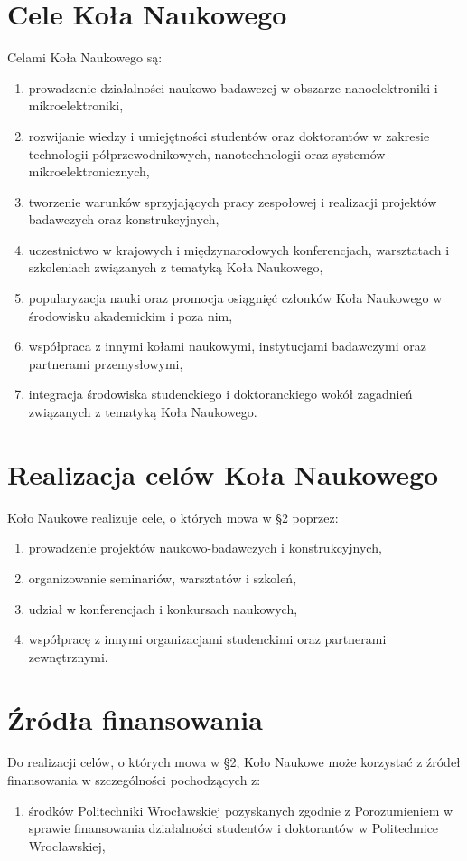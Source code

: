 \documentclass[12pt,a4paper]{article}
\begin{document}
\section{Cele Koła Naukowego}
Celami Koła Naukowego są:
\begin{enumerate}
    \item prowadzenie działalności naukowo-badawczej w obszarze nanoelektroniki i mikroelektroniki,
    \item rozwijanie wiedzy i umiejętności studentów oraz doktorantów w zakresie technologii półprzewodnikowych, nanotechnologii oraz systemów mikroelektronicznych,
    \item tworzenie warunków sprzyjających pracy zespołowej i realizacji projektów badawczych oraz konstrukcyjnych,
    \item uczestnictwo w krajowych i międzynarodowych konferencjach, warsztatach i szkoleniach związanych z tematyką Koła Naukowego,
    \item popularyzacja nauki oraz promocja osiągnięć członków Koła Naukowego w środowisku akademickim i poza nim,
    \item współpraca z innymi kołami naukowymi, instytucjami badawczymi oraz partnerami przemysłowymi,
    \item integracja środowiska studenckiego i doktoranckiego wokół zagadnień związanych z tematyką Koła Naukowego.
\end{enumerate}

\newpage

\section{Realizacja celów Koła Naukowego}
Koło Naukowe realizuje cele, o których mowa w \S 2 poprzez:
\begin{enumerate}
    \item prowadzenie projektów naukowo-badawczych i konstrukcyjnych,
    \item organizowanie seminariów, warsztatów i szkoleń,
    \item udział w konferencjach i konkursach naukowych,
    \item współpracę z innymi organizacjami studenckimi oraz partnerami zewnętrznymi.
\end{enumerate}

\section{Źródła finansowania}
Do realizacji celów, o których mowa w \S 2, Koło Naukowe może korzystać z źródeł finansowania w szczególności pochodzących z:
\begin{enumerate}
    \item środków Politechniki Wrocławskiej pozyskanych zgodnie z Porozumieniem w sprawie finansowania działalności studentów i doktorantów w Politechnice Wrocławskiej,
\end{enumerate}
\end{document}
